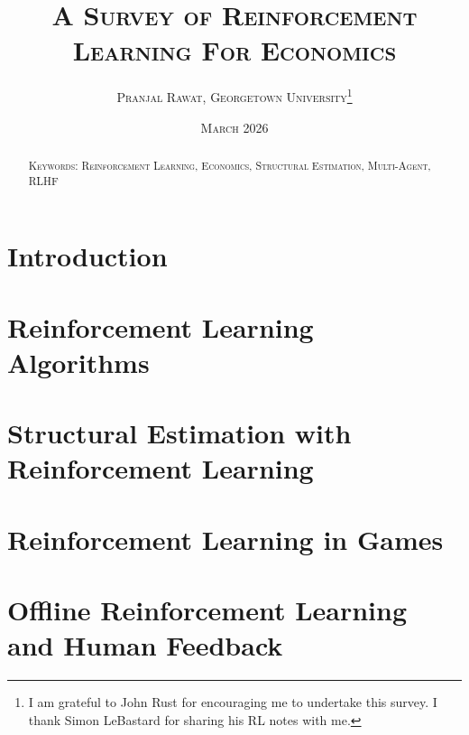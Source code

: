 \documentclass[11pt,notitlepage,a4paper]{article}
\begin{document}
\begin{titlepage}
\title{\textsc{A Survey of Reinforcement Learning For Economics}}
\author{
\textsc{Pranjal Rawat, Georgetown University}\thanks{I am grateful to John Rust for encouraging me to undertake this survey. I thank Simon LeBastard for sharing his RL notes with me.}\\
}
\date{\textsc{March 2026}}

\maketitle
\thispagestyle{empty}


\begin{abstract}
\noindent

\bigskip

\noindent \textsc{Keywords: Reinforcement Learning, Economics, Structural Estimation, Multi-Agent, RLHF}

\end{abstract}

\end{titlepage}

\newpage
\tableofcontents
\newpage

\section{Introduction}
\label{section:intro}


\section{Reinforcement Learning Algorithms}
\label{section:rl_algorithms}




\section{Structural Estimation with Reinforcement Learning}
\label{section:rl_econ_models}


\section{Reinforcement Learning in Games}
\label{section:rl_games}


\section{Offline Reinforcement Learning and Human Feedback}
\label{section:offline_rl}

\end{document}
